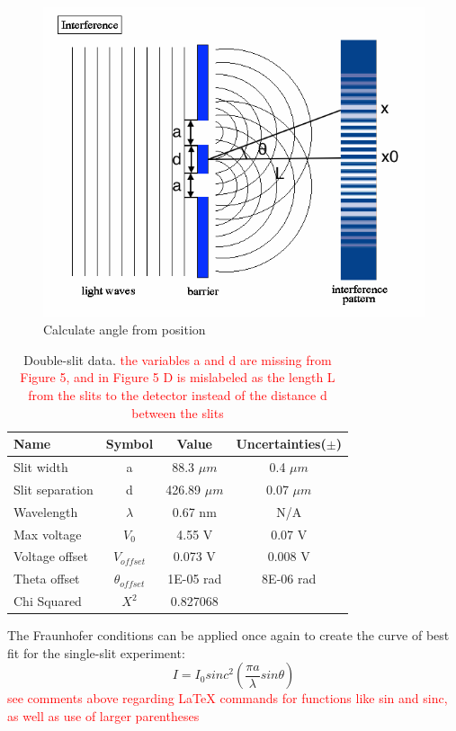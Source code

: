 \documentclass[prb,preprint]{revtex4-1}
\begin{document}
\begin{figure}[h]
\centering
\includegraphics[width=5in]{interference.png}
\caption{Calculate angle from position \cite{interference}}
\label{interference}
\end{figure}

\begin{table}[h]
\centering
\caption{Double-slit data. \textcolor{red}{the variables a and d are missing from Figure 5, and in Figure 5 D is mislabeled as the length L from the slits to the detector instead of the distance d between the slits}}
\begin{ruledtabular}
\begin{tabular}{ l c c c}
Name & Symbol & Value & Uncertainties($\pm$)\\
\hline
Slit width & a & 88.3 $\mu m$ & 0.4 $\mu m$\\
Slit separation & d & 426.89 $\mu m$ & 0.07 $\mu m$\\
Wavelength & $\lambda$ & 0.67 nm & N/A \\
Max voltage & $V_0$ & 4.55 V & 0.07 V\\
Voltage offset & $V_{offset}$ & 0.073 V & 0.008 V\\
Theta offset &$ \theta_{offset}$ & 1E-05 rad & 8E-06 rad \\
\hline
Chi Squared & $X^2$ & 0.827068&
\end{tabular}
\end{ruledtabular}
\label{data}
\end{table}

\newpage

The Fraunhofer conditions can be applied once again to create  the curve of best fit for the single-slit experiment: 
\begin{equation}
I=I_0 sinc^2 (\frac{\pi a}{\lambda} sin\theta)
\label{eq2}
\end{equation}
\textcolor{red}{see comments above regarding LaTeX commands for functions like sin and sinc, as well as use of larger parentheses}
\end{document}
